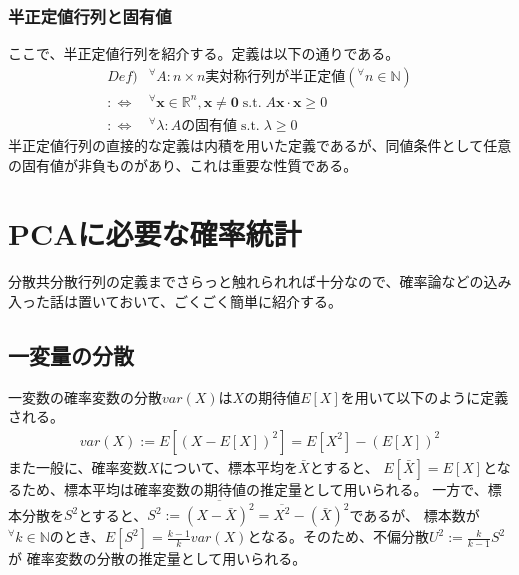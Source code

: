 \documentclass[10pt]{ujarticle}
\begin{document}
\subsubsection{半正定値行列と固有値}
ここで、半正定値行列を紹介する。定義は以下の通りである。
$$
\begin{aligned}
  Def)&^\forall A:n\times n\text{実対称行列が半正定値}(^\forall n\in\mathbb{N})\\
  :\Leftrightarrow&^\forall \mathbf{x}\in\mathbb{R}^n,\mathbf{x}\neq\mathbf{0}\;\text{s.t.}\; A\mathbf{x}\cdot\mathbf{x}\geq0\\
  :\Leftrightarrow&^\forall\lambda:A\text{の固有値}\;\text{s.t.}\;\lambda\geq 0
\end{aligned}
$$
半正定値行列の直接的な定義は内積を用いた定義であるが、同値条件として任意の固有値が非負ものがあり、これは重要な性質である。

\section{PCAに必要な確率統計}
分散共分散行列の定義までさらっと触れられれば十分なので、確率論などの込み入った話は置いておいて、ごくごく簡単に紹介する。

\subsection{一変量の分散}
一変数の確率変数の分散$var(X)$は$X$の期待値$E[X]$を用いて以下のように定義される。
$$
\begin{aligned}
  var(X):=E[(X-E[X])^2]=E[X^2]-(E[X])^2
\end{aligned}
$$
また一般に、確率変数$X$について、標本平均を$\bar{X}$とすると、
$E[\bar{X}]=E[X]$となるため、標本平均は確率変数の期待値の推定量として用いられる。
一方で、標本分散を$S^2$とすると、$S^2:=\overline{(X-\bar{X})^2}=\overline{X^2}-(\bar{X})^2$であるが、
標本数が$^\forall k\in\mathbb{N}$のとき、$E[S^2]=\frac{k-1}{k}var(X)$となる。そのため、不偏分散$U^2:=\frac{k}{k-1}S^2$が
確率変数の分散の推定量として用いられる。
\end{document}
